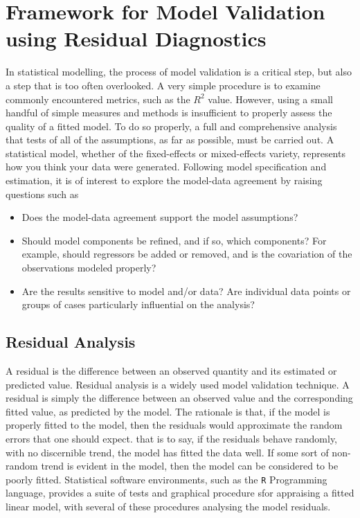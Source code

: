 \documentclass[12pt, a4paper]{article}
\begin{document}
\section{Framework for Model Validation using Residual Diagnostics}
In statistical modelling, the process of model validation is a critical step, but also a step that is too often overlooked. A very simple procedure is to examine commonly encountered
metrics, such as the $R^2$ value. However, using a small handful of simple measures and methods is insufficient to properly assess the quality of a fitted model. To do so properly, a full and comprehensive
analysis that tests of all of the assumptions, as far as possible, must be carried out. A statistical model, whether of the fixed-effects or mixed-effects variety, represents how you think your data
were generated. Following model specification and estimation, it is of interest to explore the model-data
agreement by raising questions such as
\begin{itemize}
	\item Does the model-data agreement support the model assumptions?
	\item Should model components be refined, and if so, which components? For example, should regressors
	be added or removed, and is the covariation of the observations modeled properly?
	\item Are the results sensitive to model and/or data? Are individual data points or groups of cases particularly
	influential on the analysis?
\end{itemize}


\subsection{Residual Analysis}
A residual is the difference between an observed quantity and its
estimated or predicted value. 
Residual analysis is a widely used model validation technique. A residual is simply the difference between an observed value and the corresponding fitted value, as predicted by the model. The rationale is that, if the model is properly fitted to the model, then the residuals would approximate the random errors that one should expect.
that is to say, if the residuals behave randomly, with no discernible trend, the model has fitted the data well. If some sort of non-random trend is evident in the model, then the model can be considered to be poorly fitted.
Statistical software environments, such as the \texttt{R} Programming language, provides a suite of tests and graphical procedure sfor appraising a fitted linear model, with several 
of these procedures analysing the model residuals.
\end{document}
